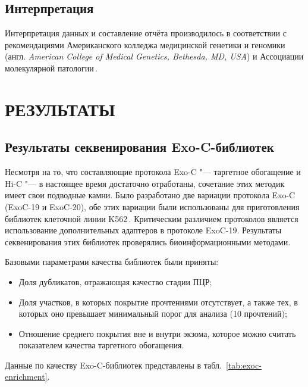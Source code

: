 \documentclass[12pt, twoside, a4paper]{article}
\newcommand{\thousands}{тыс.}
\newcommand{\engterm}[1]{англ. \textenglish{\textit{#1}}}
\newcommand{\tableref}[1]{табл.~\ref{#1}}
\begin{document}
\subsection{Интерпретация}
Интерпретация данных и составление отчёта производилось в соответствии с рекомендациями Американского колледжа медицинской генетики и геномики (\engterm{American College of Medical Genetics, Bethesda, MD, USA}) и Ассоциации молекулярной патологии\,\cite{Richards_2015}.

\section*{РЕЗУЛЬТАТЫ}

\subsection{Результаты секвенирования Exo-C\hyp{}библиотек}

Несмотря на то, что составляющие протокола Exo-C "--- таргетное обогащение и Hi-C "--- в настоящее время достаточно отработаны, сочетание этих методик имеет свои подводные камни.
Было разработано две вариации протокола Exo-C (ExoC-19 и ExoC-20), обе этих вариации были использованы для приготовления библиотек клеточной линии K562\,\citep{Ma_2018,Ramani_2016,Gridina_Forthcoming}.
Критическим различием протоколов является использование дополнительных адаптеров в протоколе ExoC-19.
Результаты секвенирования этих библиотек проверялись биоинформационными методами.

Базовыми параметрами качества библиотек были приняты:

\begin{itemize}
	\item Доля дубликатов, отражающая качество стадии ПЦР;
	\item Доля участков, в которых покрытие прочтениями отсутствует, а также тех, в которых оно превышает минимальный порог для анализа (10 прочтений);
	\item Отношение среднего покрытия вне и внутри экзома, которое можно считать показателем качества таргетного обогащения.
\end{itemize}

Данные по качеству Exo-C\hyp{}библиотек представлены в \tableref{tab:exoc-enrichment}.
\end{document}
